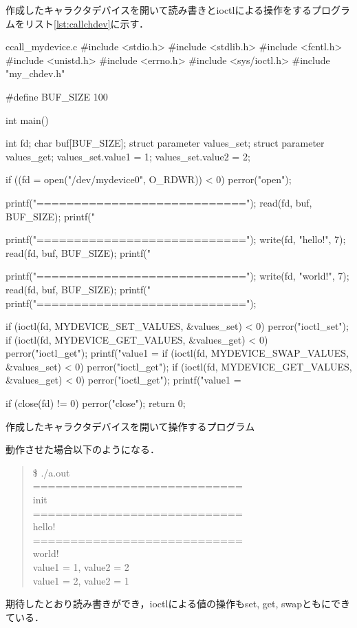 作成したキャラクタデバイスを開いて読み書きとioctlによる操作をするプログラムをリスト\ref{lst:callchdev}に示す．
\begin{longlisting}
\begin{myminted}{c}{call\_mydevice.c}
#include <stdio.h>
#include <stdlib.h>
#include <fcntl.h>
#include <unistd.h>
#include <errno.h>
#include <sys/ioctl.h>
#include "my_chdev.h"

#define BUF_SIZE 100

int main() {
    int fd;
    char buf[BUF_SIZE];
    struct parameter values_set;
    struct parameter values_get;
    values_set.value1 = 1;
    values_set.value2 = 2;

    if ((fd = open("/dev/mydevice0", O_RDWR)) < 0) perror("open");

    printf("============================\n");
    read(fd, buf, BUF_SIZE);
    printf("%

    printf("============================\n");
    write(fd, "hello!", 7);
    read(fd, buf, BUF_SIZE);
    printf("%

    printf("============================\n");
    write(fd, "world!", 7);
    read(fd, buf, BUF_SIZE);
    printf("%
    printf("============================\n");

    if (ioctl(fd, MYDEVICE_SET_VALUES, &values_set) < 0) perror("ioctl_set");
    if (ioctl(fd, MYDEVICE_GET_VALUES, &values_get) < 0) perror("ioctl_get");
    printf("value1 = %
    if (ioctl(fd, MYDEVICE_SWAP_VALUES, &values_set) < 0) perror("ioctl_get");
    if (ioctl(fd, MYDEVICE_GET_VALUES, &values_get) < 0) perror("ioctl_get");
    printf("value1 = %

    if (close(fd) != 0) perror("close");
    return 0;
}
\end{myminted}
\caption{作成したキャラクタデバイスを開いて操作するプログラム}
\label{lst:callchdev}
\end{longlisting}

動作させた場合以下のようになる．
\begin{quote}
\$ ./a.out     \\
============================ \\
init \\
============================ \\
hello! \\
============================ \\
world! \\
value1 = 1, value2 = 2 \\
value1 = 2, value2 = 1
\end{quote}

期待したとおり読み書きができ，ioctlによる値の操作もset, get, swapともにできている．

